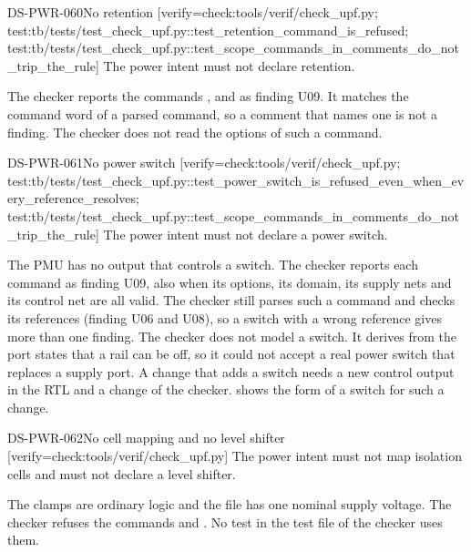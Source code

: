 \begin{requirement}{DS-PWR-060}{No retention}
[verify={check:tools/verif/check_upf.py; test:tb/tests/test_check_upf.py::test_retention_command_is_refused; test:tb/tests/test_check_upf.py::test_scope_commands_in_comments_do_not_trip_the_rule}]
The power intent must not declare retention.
\end{requirement}
\begin{information}
The checker reports the commands ,  and  as finding U09. It matches the command word of a parsed command, so a comment that names one is not a finding. The checker does not read the options of such a command.
\end{information}

\begin{requirement}{DS-PWR-061}{No power switch}
[verify={check:tools/verif/check_upf.py; test:tb/tests/test_check_upf.py::test_power_switch_is_refused_even_when_every_reference_resolves; test:tb/tests/test_check_upf.py::test_scope_commands_in_comments_do_not_trip_the_rule}]
The power intent must not declare a power switch.
\end{requirement}
\begin{information}
The PMU has no output that controls a switch. The checker reports each command  as finding U09, also when its options, its domain, its supply nets and its control net are all valid. The checker still parses such a command and checks its references (finding U06 and U08), so a switch with a wrong reference gives more than one finding. The checker does not model a switch. It derives from the port states that a rail can be off, so it could not accept a real power switch that replaces a supply port. A change that adds a switch needs a new control output in the RTL and a change of the checker.  shows the form of a switch for such a change.
\end{information}

\begin{requirement}{DS-PWR-062}{No cell mapping and no level shifter}
[verify={check:tools/verif/check_upf.py}]
The power intent must not map isolation cells and must not declare a level shifter.
\end{requirement}
\begin{information}
The clamps are ordinary logic and the file has one nominal supply voltage. The checker refuses the commands  and . No test in the test file of the checker uses them.
\end{information}

